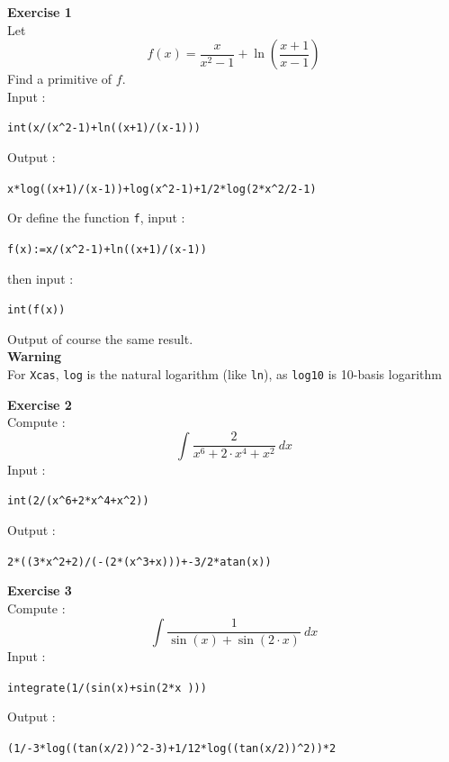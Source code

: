 \documentclass[a4paper,11pt]{book}
\begin{document}
{\bf Exercise 1}\\
Let $$f(x)=\frac {x}{x^2-1}+\ln(\frac {x+1}{x-1})$$
Find a primitive of $f$.\\
Input :
\begin{center}{\tt int(x/(x\verb|^|2-1)+ln((x+1)/(x-1)))}\end{center}
Output : 
\begin{center}{\tt x*log((x+1)/(x-1))+log(x\verb|^|2-1)+1/2*log(2*x\verb|^|2/2-1)}\end{center}
Or define the function {\tt f}, input :
\begin{center}{\tt f(x):=x/(x\verb|^|2-1)+ln((x+1)/(x-1))}\end{center}
then input :
\begin{center}{\tt int(f(x))}\end{center}
Output of course the same result.\\
{\bf Warning}\\
For {\tt Xcas}, {\tt log} is the natural logarithm (like {\tt ln}),
as {\tt log10} is 10-basis logarithm

{\bf Exercise 2}\\
Compute :
$$\int \frac {2}{x^6+2 \cdot x^4+x^2} \ dx $$
Input :
\begin{center}{\tt int(2/(x\verb|^|6+2*x\verb|^|4+x\verb|^|2))}\end{center}
Output :
\begin{center}{\tt 2*((3*x\verb|^|2+2)/(-(2*(x\verb|^|3+x)))+-3/2*atan(x))}\end{center}

{\bf Exercise 3}\\
Compute :
$$\int \frac {1}{\sin(x)+\sin(2 \cdot x )} \ dx $$
Input :
\begin{center}{\tt integrate(1/(sin(x)+sin(2*x )))}\end{center}
Output :
\begin{center}{\tt (1/-3*log((tan(x/2))\verb|^|2-3)+1/12*log((tan(x/2))\verb|^|2))*2}\end{center} 
\end{document}
